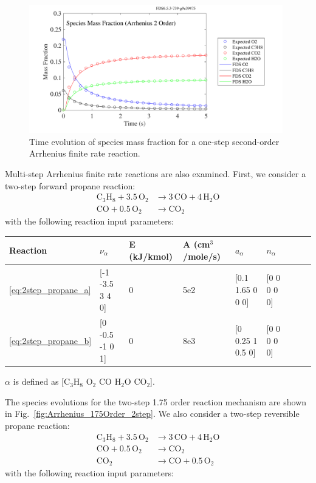 \documentclass[11pt]{book}
\begin{document}
\begin{figure}[h!]
\begin{center}
\includegraphics[height=2.2in]{SCRIPT_FIGURES/reactionrate_arrhenius_2order_1step}
\end{center}
\caption[Species evolution in a 2-order 1-step finite rate reaction]{Time evolution of species mass fraction for a one-step second-order Arrhenius finite rate reaction.}
\label{fig:Arrhenius_2Order_1step}
\end{figure}
Multi-step Arrhenius finite rate reactions are also examined. First, we consider a two-step forward propane reaction:
\begin{subequations}
\begin{align}
\label{eq:2step_propane_a}
\mathrm{C_3H_8+3.5 \, O_2} &\rightarrow  \mathrm{3 \, CO + 4 \, H_2O} \\
\label{eq:2step_propane_b}
\mathrm{CO+0.5 \, O_2} &\rightarrow \mathrm{CO_2}
\end{align}
\end{subequations}
with the following reaction input parameters:

\begin{center}
\begin{tabular}{|l|l|l|l|l|l|l|l|l|}
\hline Reaction & $\nu_{\alpha}$ & E (kJ/kmol) & A (cm$^3$/mole/s) & $a_{\alpha}$ & $n_{\alpha}$  \\ \hline \hline
\ref{eq:2step_propane_a} & [-1 -3.5 3 4 0] & 0 & 5e2 & [0.1 1.65 0 0 0] & [0 0 0 0 0] \\ \hline
\ref{eq:2step_propane_b} & [0 -0.5 -1 0 1] & 0 & 8e3 & [0 0.25 1 0.5 0] & [0 0 0 0 0] \\ \hline
\end{tabular}
\vskip8pt
$\alpha$ is defined as [$\mathrm{C_3H_8}$ $\mathrm{O_2}$ $\mathrm{CO}$ $\mathrm{H_2O}$ $\mathrm{CO_2}$].
\end{center}
The species evolutions for the two-step 1.75 order reaction mechanism are shown in Fig.~\ref{fig:Arrhenius_175Order_2step}. We also consider a two-step reversible propane reaction:
\begin{subequations}
\begin{align}
\label{eq:2step_propane_rev_a}
\mathrm{C_3H_8+3.5 \, O_2} &\rightarrow \mathrm{3 \, CO+4 \, H_2O} \\
\label{eq:2step_propane_rev_b}
\mathrm{CO + 0.5 \, O_2} &\rightarrow \mathrm{CO_2} \\
\label{eq:2step_propane_rev_c}
\mathrm{CO_2} &\rightarrow \mathrm{CO + 0.5 \, O_2}
\end{align}
\end{subequations}
with the following reaction input parameters:
\end{document}
